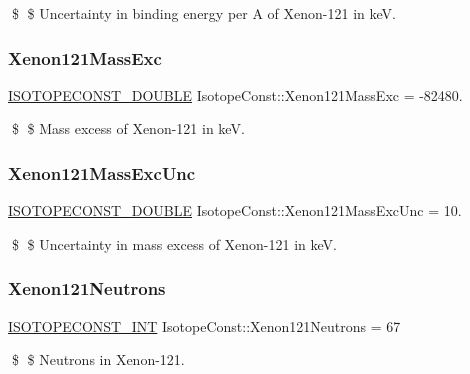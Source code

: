 \$ \$ Uncertainty in binding energy per A of Xenon-\/121 in keV. \mbox{\label{group___isotope_const-_xenon-_xe121_ga6aca32b969569d12082c3255c1f5335f}} 
\subsubsection{\texorpdfstring{Xenon121\+Mass\+Exc}{Xenon121MassExc}}
{\footnotesize\ttfamily \mbox{\hyperlink{group___isotope_const-_macros_ga8f45a7272ce02c0b4c65c44636ed719a}{I\+S\+O\+T\+O\+P\+E\+C\+O\+N\+S\+T\+\_\+\+D\+O\+U\+B\+LE}} Isotope\+Const\+::\+Xenon121\+Mass\+Exc = -\/82480.}

\$ \$ Mass excess of Xenon-\/121 in keV. \mbox{\label{group___isotope_const-_xenon-_xe121_gab663f6c80376456394d7940e4a43746e}} 
\subsubsection{\texorpdfstring{Xenon121\+Mass\+Exc\+Unc}{Xenon121MassExcUnc}}
{\footnotesize\ttfamily \mbox{\hyperlink{group___isotope_const-_macros_ga8f45a7272ce02c0b4c65c44636ed719a}{I\+S\+O\+T\+O\+P\+E\+C\+O\+N\+S\+T\+\_\+\+D\+O\+U\+B\+LE}} Isotope\+Const\+::\+Xenon121\+Mass\+Exc\+Unc = 10.}

\$ \$ Uncertainty in mass excess of Xenon-\/121 in keV. \mbox{\label{group___isotope_const-_xenon-_xe121_ga876a0ae5fa5a1591b247014738e24250}} 
\subsubsection{\texorpdfstring{Xenon121\+Neutrons}{Xenon121Neutrons}}
{\footnotesize\ttfamily \mbox{\hyperlink{group___isotope_const-_macros_ga5f18360b3e99483a35c32d789e62621c}{I\+S\+O\+T\+O\+P\+E\+C\+O\+N\+S\+T\+\_\+\+I\+NT}} Isotope\+Const\+::\+Xenon121\+Neutrons = 67}

\$ \$ Neutrons in Xenon-\/121. \mbox{\label{group___isotope_const-_xenon-_xe121_ga3572e05ba00ef93cb297c64bab0331cd}} 

